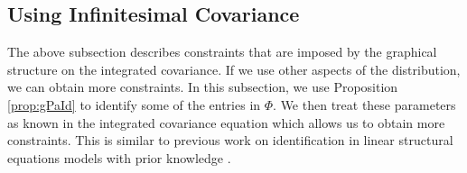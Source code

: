 \documentclass[accepted]{uai2021} %
\begin{document}
\subsection{Using Infinitesimal Covariance}
\label{ssec:eqInfCov}

The above subsection describes constraints that are imposed by the graphical 
structure on the integrated 
covariance. If we use other aspects of 
the distribution, 
we can obtain more constraints. In this subsection, we use Proposition 
\ref{prop:gPaId} to identify some of the entries in $\Phi$. We then treat these 
parameters as known in the integrated covariance equation which allows us to 
obtain more constraints. This is similar to previous work on identification in 
linear structural equations models with prior knowledge  
\citep{chenIJCAI2016,chenICML2017}.
\end{document}
